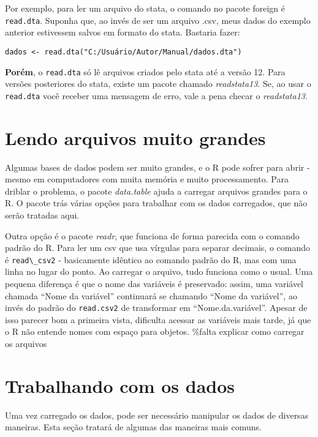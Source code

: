 \documentclass[]{book}
\begin{document}
Por exemplo, para ler um arquivo do stata, o comando no pacote foreign é
\texttt{read.dta}. Suponha que, ao invés de ser um arquivo .csv, meus
dados do exemplo anterior estivessem salvos em formato do stata.
Bastaria fazer:

\begin{verbatim}
dados <- read.dta("C:/Usuário/Autor/Manual/dados.dta")
\end{verbatim}

\textbf{Porém}, o \texttt{read.dta} só lê arquivos criados pelo stata
até a versão 12. Para versões posteriores do stata, existe um pacote
chamado \emph{readstata13}. Se, ao usar o \texttt{read.dta} você receber
uma mensagem de erro, vale a pena checar o \emph{readstata13}.

\section{Lendo arquivos muito
grandes}\label{lendo-arquivos-muito-grandes}

Algumas bases de dados podem ser muito grandes, e o R pode sofrer para
abrir - mesmo em computadores com muita memória e muito processamento.
Para driblar o problema, o pacote \emph{data.table} ajuda a carregar
arquivos grandes para o R. O pacote trás várias opções para trabalhar
com os dados carregados, que não serão tratadas aqui.

Outra opção é o pacote \emph{readr}, que funciona de forma parecida com
o comando padrão do R. Para ler um csv que usa vírgulas para separar
decimais, o comando é \texttt{read\textbackslash{}\_csv2} - basicamente
idêntico ao comando padrão do R, mas com uma linha no lugar do ponto. Ao
carregar o arquivo, tudo funciona como o usual. Uma pequena diferença é
que o nome das variáveis é preservado: assim, uma variável chamada
``Nome da variável'' continuará se chamando ``Nome da variável'', ao
invés do padrão do \texttt{read.csv2} de transformar em
``Nome.da.variável''. Apesar de isso parecer bom a primeira vista,
dificulta acessar as variáveis mais tarde, já que o R não entende nomes
com espaço para objetos. \%falta explicar como carregar os arquivos

\section{Trabalhando com os dados}\label{trabalhando-com-os-dados}

Uma vez carregado os dados, pode ser necessário manipular os dados de
diversas maneiras. Esta seção tratará de algumas das maneiras mais
comuns.
\end{document}

